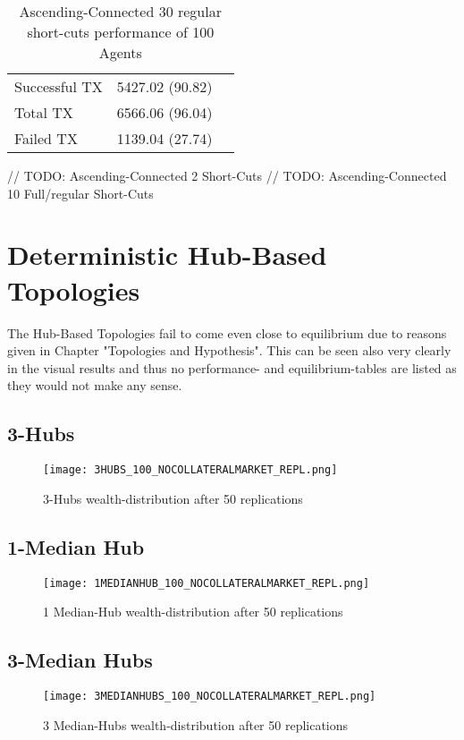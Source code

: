 \documentclass[Bachelorarbeit.tex]{subfiles}
\begin{document}
\begin{table}[!htbp]
	\caption{Ascending-Connected 30 regular short-cuts performance of 100 Agents}
	\centering
	\begin{tabular} { l c r }
		\hline
		Successful TX & 5427.02 (90.82) \\
		Total TX & 6566.06 (96.04) \\
		Failed TX & 1139.04 (27.74) \\
		\hline
	\end{tabular}
\end{table}

// TODO: Ascending-Connected 2 Short-Cuts
// TODO: Ascending-Connected 10 Full/regular Short-Cuts


\section{Deterministic Hub-Based Topologies} 
The Hub-Based Topologies fail to come even close to equilibrium due to reasons given in Chapter "Topologies and Hypothesis". This can be seen also very clearly in the visual results and thus no performance- and equilibrium-tables are listed as they would not make any sense.

\subsection{3-Hubs}
\begin{figure}[!htbp]
	\centering
  \texttt{[image: 3HUBS\_100\_NOCOLLATERALMARKET\_REPL.png]}
	\caption{3-Hubs wealth-distribution after 50 replications}
	\label{fig1}
\end{figure}

\subsection{1-Median Hub}
\begin{figure}[!htbp]
	\centering
  \texttt{[image: 1MEDIANHUB\_100\_NOCOLLATERALMARKET\_REPL.png]}
	\caption{1 Median-Hub wealth-distribution after 50 replications}
	\label{fig1}
\end{figure}

\subsection{3-Median Hubs}
\begin{figure}[!htbp]
	\centering
  \texttt{[image: 3MEDIANHUBS\_100\_NOCOLLATERALMARKET\_REPL.png]}
	\caption{3 Median-Hubs wealth-distribution after 50 replications}
	\label{fig1}
\end{figure}
\end{document}
